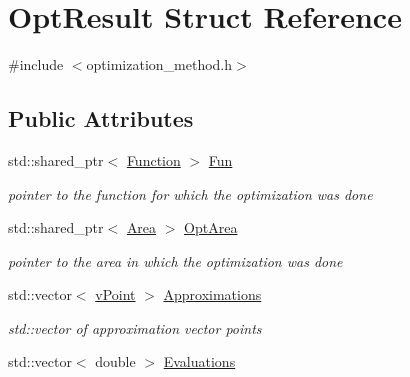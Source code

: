 \hypertarget{struct_opt_result}{}\section{Opt\+Result Struct Reference}
\label{struct_opt_result}


{\ttfamily \#include $<$optimization\+\_\+method.\+h$>$}

\subsection*{Public Attributes}
\begin{DoxyCompactItemize}
\item 
\mbox{\label{struct_opt_result_ac00c99bd944240cc974270276330a9a0}} 
std\+::shared\+\_\+ptr$<$ \hyperlink{class_function}{Function} $>$ \hyperlink{struct_opt_result_ac00c99bd944240cc974270276330a9a0}{Fun}
\begin{DoxyCompactList}\small\item\em pointer to the function for which the optimization was done \end{DoxyCompactList}\item 
\mbox{\label{struct_opt_result_a6edfe9aa97b9b9f878d5608cde3708a3}} 
std\+::shared\+\_\+ptr$<$ \hyperlink{class_area}{Area} $>$ \hyperlink{struct_opt_result_a6edfe9aa97b9b9f878d5608cde3708a3}{Opt\+Area}
\begin{DoxyCompactList}\small\item\em pointer to the area in which the optimization was done \end{DoxyCompactList}\item 
\mbox{\label{struct_opt_result_ad461a01a3be3bdce6b78713f701342c9}} 
std\+::vector$<$ \hyperlink{classv_point}{v\+Point} $>$ \hyperlink{struct_opt_result_ad461a01a3be3bdce6b78713f701342c9}{Approximations}
\begin{DoxyCompactList}\small\item\em std\+::vector of approximation vector points \end{DoxyCompactList}\item 
\mbox{\label{struct_opt_result_a0ba90701207d29e434638eac26f0d446}} 
std\+::vector$<$ double $>$ \hyperlink{struct_opt_result_a0ba90701207d29e434638eac26f0d446}{Evaluations}

\end{DoxyCompactItemize}
